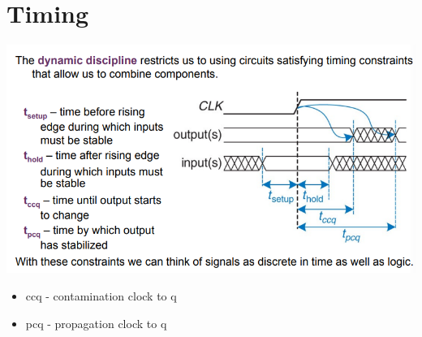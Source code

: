 \documentclass{article}[18pt]
\begin{document}
\section{Timing}
\begin{center}
	\includegraphics[scale=0.7]{figure16}
\end{center}
\begin{itemize}
	\item ccq - contamination clock to q
	\item pcq - propagation clock to q
\end{itemize}
\end{document}
